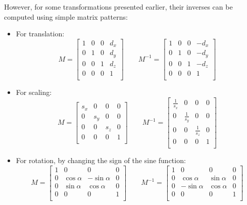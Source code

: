 However, for some transformations presented earlier, their inverses can be computed using simple matrix patterns:
\begin{itemize}
    \item For translation:
        \[M=\begin{bmatrix}
            1 & 0 & 0 & d_x \\
            0 & 1 & 0 & d_y \\
            0 & 0 & 1 & d_z \\
            0 & 0 & 0 & 1   \\
        \end{bmatrix}
        \qquad 
        M^{-1}=\begin{bmatrix}
            1 & 0 & 0 & -d_x \\
            0 & 1 & 0 & -d_y \\
            0 & 0 & 1 & -d_z \\
            0 & 0 & 0 & 1   \\
        \end{bmatrix}\]
    \item For scaling:
        \[M=\begin{bmatrix}
            s_x & 0   & 0   & 0 \\
            0   & s_y & 0   & 0 \\
            0   & 0   & s_z & 0 \\
            0   & 0   & 0   & 1 \\
        \end{bmatrix}
        \qquad 
        M^{-1}=\begin{bmatrix}
            \frac{1}{s_x} & 0   & 0   & 0 \\
            0   & \frac{1}{s_y} & 0   & 0 \\
            0   & 0   & \frac{1}{s_z} & 0 \\
            0   & 0   & 0   & 1 \\
        \end{bmatrix}\]
    \item For rotation, by changing the sign of the sine function:
        \[M=\begin{bmatrix}
            1 & 0   & 0   & 0 \\
            0   & \cos \alpha & - \sin \alpha   & 0 \\
            0   & \sin \alpha   & \cos \alpha & 0 \\
            0   & 0   & 0   & 1 \\
        \end{bmatrix}
        \qquad
        M^{-1}=\begin{bmatrix}
            1 & 0   & 0   & 0 \\
            0   & \cos \alpha & \sin \alpha   & 0 \\
            0   & -\sin \alpha   & \cos \alpha & 0 \\
            0   & 0   & 0   & 1 \\
        \end{bmatrix}\] 
\end{itemize}